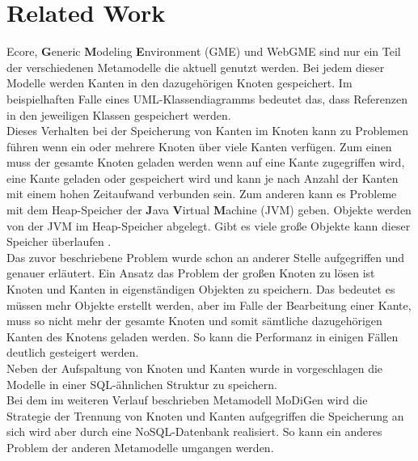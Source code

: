 \section{Related Work}
Ecore, \textbf{G}eneric \textbf{M}odeling \textbf{E}nvironment (GME) \cite{ledeczi2001generic} und WebGME \cite{maroti2014online} sind nur ein Teil der verschiedenen Metamodelle die aktuell genutzt werden. Bei jedem dieser Modelle werden Kanten in den dazugehörigen Knoten gespeichert. Im beispielhaften Falle eines UML-Klassendiagramms bedeutet das, dass Referenzen in den jeweiligen Klassen gespeichert werden.\\
Dieses Verhalten bei der Speicherung von Kanten im Knoten kann zu Problemen führen wenn ein oder mehrere Knoten über viele Kanten verfügen. Zum einen muss der gesamte Knoten geladen werden wenn auf eine Kante zugegriffen wird, eine Kante geladen oder gespeichert wird und kann je nach Anzahl der Kanten mit einem hohen Zeitaufwand verbunden sein. Zum anderen kann es Probleme mit dem Heap-Speicher der \textbf{J}ava \textbf{V}irtual \textbf{M}achine (JVM) geben. Objekte werden von der JVM im Heap-Speicher abgelegt. Gibt es viele große Objekte kann dieser Speicher überlaufen \cite{Chen2005EFF}.\\
Das zuvor beschriebene Problem wurde schon an anderer Stelle \cite{scheidgen2013reference} aufgegriffen und genauer erläutert. Ein Ansatz das Problem der großen Knoten zu lösen ist Knoten und Kanten in eigenständigen Objekten zu speichern. Das bedeutet es müssen mehr Objekte erstellt werden, aber im Falle der Bearbeitung einer Kante, muss so nicht mehr der gesamte Knoten und somit sämtliche dazugehörigen Kanten des Knotens geladen werden. So kann die Performanz in einigen Fällen deutlich gesteigert werden.\\
Neben der Aufspaltung von Knoten und Kanten wurde in \cite{scheidgen2013reference} vorgeschlagen die Modelle in einer SQL-ähnlichen Struktur zu speichern.\\ 
Bei dem im weiteren Verlauf beschrieben Metamodell MoDiGen wird die Strategie der Trennung von Knoten und Kanten aufgegriffen die Speicherung an sich wird aber durch eine NoSQL-Datenbank realisiert. So kann ein anderes Problem der anderen Metamodelle umgangen werden.

